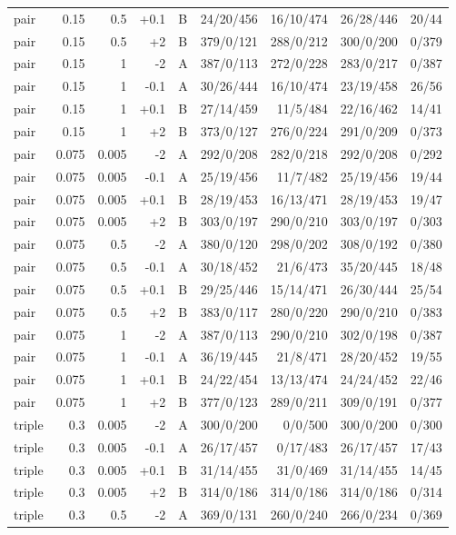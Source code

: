 \begin{longtable}{@{}lrrrlrrrr@{}}
pair & 0.15 & 0.5 & +0.1 & B & 24/20/456 & 16/10/474 & 26/28/446 & 20/44\\
pair & 0.15 & 0.5 & +2 & B & 379/0/121 & 288/0/212 & 300/0/200 & 0/379\\
pair & 0.15 & 1 & -2 & A & 387/0/113 & 272/0/228 & 283/0/217 & 0/387\\
pair & 0.15 & 1 & -0.1 & A & 30/26/444 & 16/10/474 & 23/19/458 & 26/56\\
pair & 0.15 & 1 & +0.1 & B & 27/14/459 & 11/5/484 & 22/16/462 & 14/41\\
pair & 0.15 & 1 & +2 & B & 373/0/127 & 276/0/224 & 291/0/209 & 0/373\\
pair & 0.075 & 0.005 & -2 & A & 292/0/208 & 282/0/218 & 292/0/208 & 0/292\\
pair & 0.075 & 0.005 & -0.1 & A & 25/19/456 & 11/7/482 & 25/19/456 & 19/44\\
pair & 0.075 & 0.005 & +0.1 & B & 28/19/453 & 16/13/471 & 28/19/453 & 19/47\\
pair & 0.075 & 0.005 & +2 & B & 303/0/197 & 290/0/210 & 303/0/197 & 0/303\\
pair & 0.075 & 0.5 & -2 & A & 380/0/120 & 298/0/202 & 308/0/192 & 0/380\\
pair & 0.075 & 0.5 & -0.1 & A & 30/18/452 & 21/6/473 & 35/20/445 & 18/48\\
pair & 0.075 & 0.5 & +0.1 & B & 29/25/446 & 15/14/471 & 26/30/444 & 25/54\\
pair & 0.075 & 0.5 & +2 & B & 383/0/117 & 280/0/220 & 290/0/210 & 0/383\\
pair & 0.075 & 1 & -2 & A & 387/0/113 & 290/0/210 & 302/0/198 & 0/387\\
pair & 0.075 & 1 & -0.1 & A & 36/19/445 & 21/8/471 & 28/20/452 & 19/55\\
pair & 0.075 & 1 & +0.1 & B & 24/22/454 & 13/13/474 & 24/24/452 & 22/46\\
pair & 0.075 & 1 & +2 & B & 377/0/123 & 289/0/211 & 309/0/191 & 0/377\\
triple & 0.3 & 0.005 & -2 & A & 300/0/200 & 0/0/500 & 300/0/200 & 0/300\\
triple & 0.3 & 0.005 & -0.1 & A & 26/17/457 & 0/17/483 & 26/17/457 & 17/43\\
triple & 0.3 & 0.005 & +0.1 & B & 31/14/455 & 31/0/469 & 31/14/455 & 14/45\\
triple & 0.3 & 0.005 & +2 & B & 314/0/186 & 314/0/186 & 314/0/186 & 0/314\\
triple & 0.3 & 0.5 & -2 & A & 369/0/131 & 260/0/240 & 266/0/234 & 0/369\\

\end{longtable}
